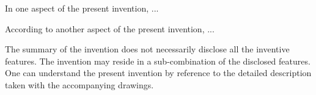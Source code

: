 



In one aspect of the present invention,  
	...




According to another aspect of the present invention, 
	...








The summary of the invention does not necessarily disclose all the inventive features. The invention may reside in a sub-combination of the disclosed features. One can understand the present invention by reference to the detailed description taken with the accompanying drawings.




